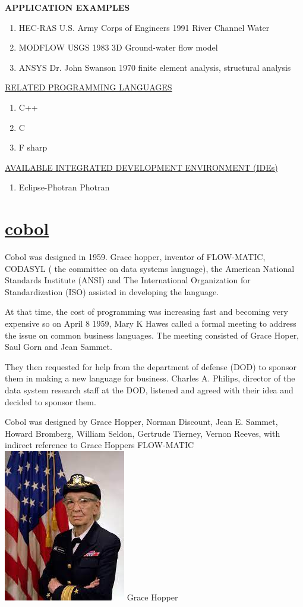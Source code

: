 \documentclass{article}
\begin{document}
\newpage
\textbf{APPLICATION EXAMPLES}
\begin{enumerate}
	\item HEC-RAS U.S. Army Corps of Engineers 1991 River Channel Water\\
	\item MODFLOW USGS 1983 3D Ground-water flow model\\
	\item ANSYS Dr. John Swanson 1970 finite element analysis, structural
	analysis\\
\end{enumerate}

\newpage
\underline{RELATED PROGRAMMING LANGUAGES}
\begin{enumerate}
	\item C++
	\item C
	\item F sharp
\end{enumerate}

\underline{AVAILABLE INTEGRATED DEVELOPMENT ENVIRONMENT (IDEs)}
\begin{enumerate}
\item Eclipse-Photran Photran
\end{enumerate}

\newpage
\section{\underline{cobol}}
Cobol was designed in 1959. Grace hopper, inventor of FLOW-MATIC, CODASYL ( the committee on data systems language), the American National Standards Institute (ANSI) and The International Organization for Standardization (ISO) assisted in developing the language.

At that time, the cost of programming was increasing fast and becoming very expensive so on April 8 1959, Mary K Hawes called a formal meeting to address the issue on common business languages. The meeting consisted of Grace Hoper, Saul Gorn and Jean Sammet.

They then requested for help from the department of defense (DOD) to sponsor  them in making a new language for business. Charles A. Philips, director of the data system research staff at the DOD, listened and agreed with their idea and decided to sponsor them.

Cobol was designed by Grace Hopper, Norman Discount, Jean E. Sammet, Howard Bromberg, William Seldon, Gertrude Tierney, Vernon Reeves,  with indirect reference to Grace Hoppers FLOW-MATIC\\
\newpage
\includegraphics{grace hopper.jpg}
{Grace Hopper}
\end{document}
